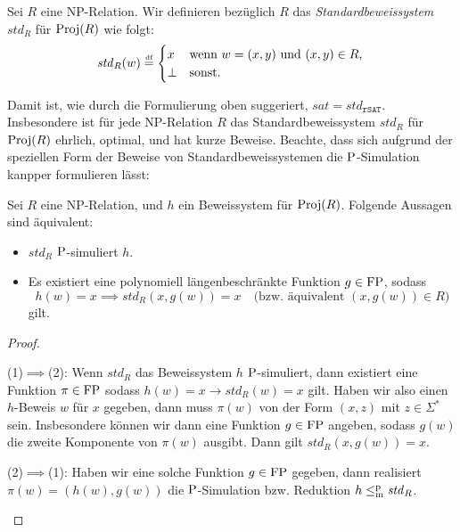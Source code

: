 \begin{definition}
    Sei $R$ eine NP-Relation. Wir definieren bezüglich $R$ das \emph{Standardbeweissystem} $\mathit{std}_R$ für $\Proj(R)$ wie folgt:
    \[ \mathit{std}_R(w) \defeq \begin{cases} x & \text{wenn $w=(x,y)$ und $(x,y)\in R$,}\\
    \bot & \text{sonst}.\end{cases} \qedhere \] 
\end{definition}
Damit ist, wie durch die Formulierung oben suggeriert, $\mathit{sat}=\mathit{std}_{\mathtt{rSAT}}$.
Insbesondere ist für jede NP-Relation $R$ das Standardbeweissystem $\mathit{std}_R$ für $\Proj(R)$ ehrlich, optimal, und hat kurze Beweise.
Beachte, dass sich aufgrund der speziellen Form der Beweise von Standardbeweissystemen die $\P$-Simulation kanpper formulieren lässt:
\begin{observation}\label{obs:simulation-of-spps}
    Sei $R$ eine NP-Relation, und $h$ ein Beweissystem für $\Proj(R)$. Folgende Aussagen sind äquivalent:
    \begin{itemize}
        \item $\mathit{std}_R$ $\P$-simuliert $h$.
        \item Es existiert eine polynomiell längenbeschränkte Funktion $g\in\FP$, sodass
            \[ h(w)=x \implies \mathit{std}_R(x, g(w))=x \quad\text{(bzw. äquivalent $(x, g(w))\in R$)} \]
            gilt.
    \end{itemize}
\end{observation}
\begin{proof}
    \begin{prooflist}
    (1)$\implies$(2): Wenn $\mathit{std}_R$ das Beweissystem $h$ $\P$-simuliert, dann existiert eine Funktion $\pi\in\FP$ sodass $h(w)=x\rightarrow \mathit{std}_R(w)=x$ gilt.
    Haben wir also einen $h$-Beweis $w$ für $x$ gegeben, dann muss $\pi(w)$ von der Form $(x, z)$ mit $z\in\Sigma^*$ sein. Insbesondere können wir dann eine Funktion $g\in\FP$ angeben, sodass $g(w)$ die zweite Komponente von $\pi(w)$ ausgibt. Dann gilt $\mathit{std}_R(x, g(w))=x$.

    (2)$\implies$(1): Haben wir eine solche Funktion $g\in\FP$ gegeben, dann realisiert $\pi(w)=(h(w), g(w))$ die $\P$-Simulation bzw. Reduktion $h\leqmp \mathit{std}_R$.
    \end{prooflist}
\end{proof}

